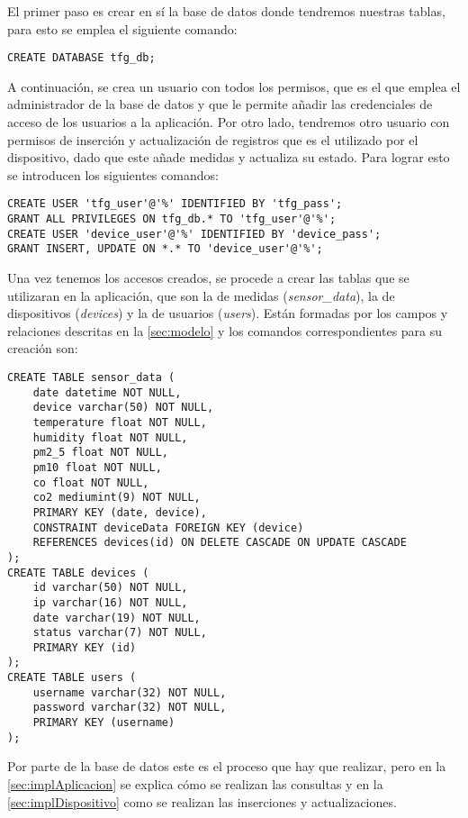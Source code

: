 El primer paso es crear en sí la base de datos donde tendremos nuestras tablas, para esto se emplea el siguiente comando:
\begin{lstlisting}
CREATE DATABASE tfg_db;
\end{lstlisting}

A continuación, se crea un usuario con todos los permisos, que es el que emplea el administrador de la base de datos y que le permite añadir las credenciales de acceso de los usuarios a la aplicación. Por otro lado, tendremos otro usuario con permisos de inserción y actualización de registros que es el utilizado por el dispositivo, dado que este añade medidas y actualiza su estado. Para lograr esto se introducen los siguientes comandos:
\begin{lstlisting}
CREATE USER 'tfg_user'@'%' IDENTIFIED BY 'tfg_pass';
GRANT ALL PRIVILEGES ON tfg_db.* TO 'tfg_user'@'%';
CREATE USER 'device_user'@'%' IDENTIFIED BY 'device_pass';
GRANT INSERT, UPDATE ON *.* TO 'device_user'@'%';
\end{lstlisting}

Una vez tenemos los accesos creados, se procede a crear las tablas que se utilizaran en la aplicación, que son la de medidas (\textit{sensor\_data}), la de dispositivos (\textit{devices}) y la de usuarios (\textit{users}). Están formadas por los campos y relaciones descritas en la \autoref{sec:modelo} y los comandos correspondientes para su creación son:
\begin{lstlisting}
CREATE TABLE sensor_data (
    date datetime NOT NULL,
    device varchar(50) NOT NULL,
    temperature float NOT NULL,
    humidity float NOT NULL,
    pm2_5 float NOT NULL,
    pm10 float NOT NULL,
    co float NOT NULL,
    co2 mediumint(9) NOT NULL,
    PRIMARY KEY (date, device),
    CONSTRAINT deviceData FOREIGN KEY (device) 
    REFERENCES devices(id) ON DELETE CASCADE ON UPDATE CASCADE
);
CREATE TABLE devices (
    id varchar(50) NOT NULL,
    ip varchar(16) NOT NULL,
    date varchar(19) NOT NULL,
    status varchar(7) NOT NULL,
    PRIMARY KEY (id)
);
CREATE TABLE users (
    username varchar(32) NOT NULL,
    password varchar(32) NOT NULL,
    PRIMARY KEY (username)
);
\end{lstlisting}

Por parte de la base de datos este es el proceso que hay que realizar, pero en la \autoref{sec:implAplicacion} se explica cómo se realizan las consultas y en la \autoref{sec:implDispositivo} como se realizan las inserciones y actualizaciones.

